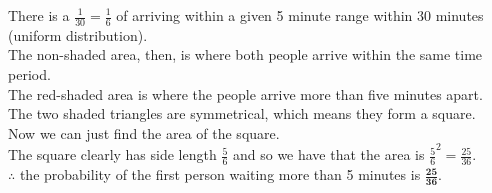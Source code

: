 \documentclass{article}
\theoremstyle{definition}
\theoremstyle{remark}
\theoremstyle{example}
\begin{document}
\begin{enumerate}
\begin{center}
		\end{center}
		
		There is a $\frac{1}{30}=\frac{1}{6}$ of arriving within a given 5 minute range within 30 minutes (uniform distribution).\\
		The non-shaded area, then, is where both people arrive within the same time period.\\
		The red-shaded area is where the people arrive more than five minutes apart.\\
		The two shaded triangles are symmetrical, which means they form a square.\\
		Now we can just find the area of the square.\\
		The square clearly has side length $\frac{5}{6}$ and so we have that the area is $\frac{5}{6}^2=\frac{25}{36}$.\\
		$\therefore$ the probability of the first person waiting more than 5 minutes is $\mathbf{\frac{25}{36}}$.
		

\end{enumerate}
\end{document}

